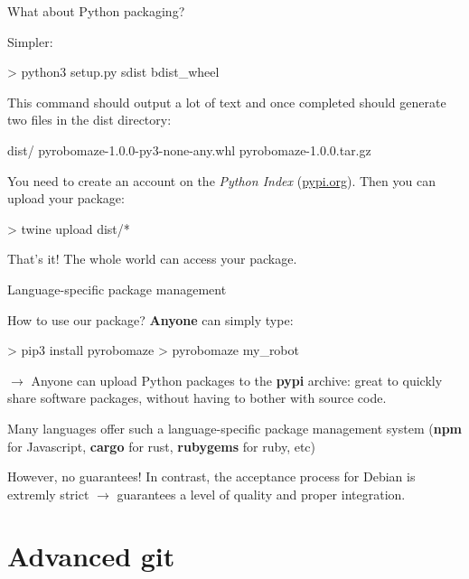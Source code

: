 \documentclass[compress]{beamer}
\begin{document}
\begin{frame}[fragile]{What about Python packaging?}

    Simpler:

\begin{shcode}
> python3 setup.py sdist bdist_wheel
\end{shcode}

This command should output a lot of text and once completed should generate two files in the dist directory:

\begin{shcode}
dist/
  pyrobomaze-1.0.0-py3-none-any.whl
  pyrobomaze-1.0.0.tar.gz
\end{shcode}

    You need to create an account on the \emph{Python Index} (\url{pypi.org}).
    Then you can upload your package:

\begin{shcode}
> twine upload dist/*
\end{shcode}

That's it! The whole world can access your package.


\end{frame}


\begin{frame}[fragile]{Language-specific package management}

    How to use our package? {\bf Anyone} can simply type:

\begin{shcode}
> pip3 install pyrobomaze
> pyrobomaze my_robot
\end{shcode}

    $\rightarrow$ Anyone can upload Python packages to the {\bf pypi} archive: great to
    quickly share software packages, without having to bother with source code.

\pause

    Many languages offer such a language-specific package management system
    ({\bf npm} for Javascript, {\bf cargo} for rust, {\bf rubygems} for ruby,
    etc)

\pause

    However, no guarantees! In contrast, the acceptance process for Debian is
    extremly strict $\rightarrow$ guarantees a level of quality and proper
    integration.

\end{frame}

\section[Sharing]{Advanced git}
\end{document}
